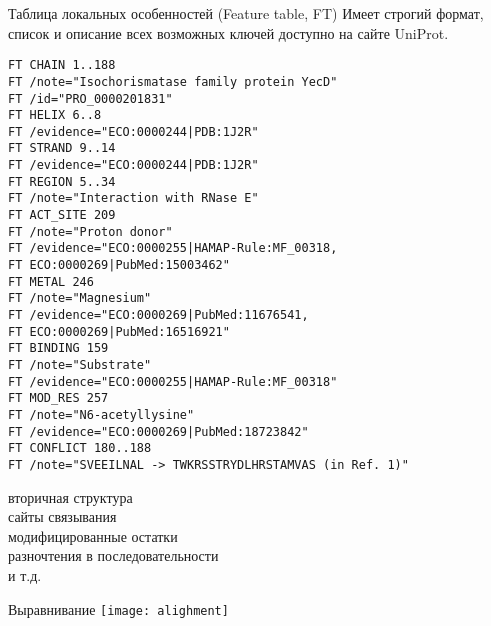 \begin{frame}[fragile]{Таблица локальных особенностей (Feature table, FT)}
Имеет строгий формат, список и описание всех возможных ключей доступно на сайте UniProt.
\begin{multicols}{2}
    \tiny
    \begin{verbatim}
FT CHAIN 1..188
FT /note="Isochorismatase family protein YecD"
FT /id="PRO_0000201831"
FT HELIX 6..8
FT /evidence="ECO:0000244|PDB:1J2R"
FT STRAND 9..14
FT /evidence="ECO:0000244|PDB:1J2R"
FT REGION 5..34
FT /note="Interaction with RNase E"
FT ACT_SITE 209
FT /note="Proton donor"
FT /evidence="ECO:0000255|HAMAP-Rule:MF_00318,
FT ECO:0000269|PubMed:15003462"
FT METAL 246
FT /note="Magnesium"
FT /evidence="ECO:0000269|PubMed:11676541,
FT ECO:0000269|PubMed:16516921"
FT BINDING 159
FT /note="Substrate"
FT /evidence="ECO:0000255|HAMAP-Rule:MF_00318"
FT MOD_RES 257
FT /note="N6-acetyllysine"
FT /evidence="ECO:0000269|PubMed:18723842"
FT CONFLICT 180..188
FT /note="SVEEILNAL -> TWKRSSTRYDLHRSTAMVAS (in Ref. 1)"
\end{verbatim}
    \columnbreak
    \normalsize
    вторичная структура\\
    \vspace{1cm}
сайты связывания\\
    \vspace{1cm}
модифицированные остатки\\
    \vspace{1cm}
разночтения в
последовательности\\
    \vspace{1cm}
и т.д.
\end{multicols}
\end{frame}

\begin{frame}{Выравнивание}
    \centering
    \texttt{[image: alighment]}

\end{frame}


